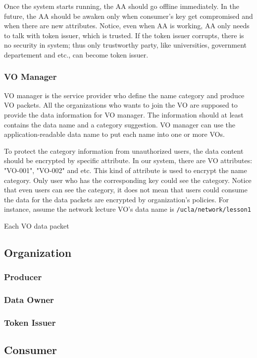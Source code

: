 Once the system starts running, the AA should go offline immediately.
In the future, the AA should be awaken only when consumer's key get compromised and when there are new attributes.
Notice, even when AA is working, AA only needs to talk with token issuer, which is trusted.
If the token issuer corrupts, there is no security in system; thus only trustworthy party, like universities, government departement and etc., can become token issuer.

\subsubsection{VO Manager}
VO manager is the service provider who define the name category and produce VO packets.
All the organizations who wants to join the VO are supposed to provide the data information for VO manager.
The information should at least contains the data name and a category suggestion.
VO manager can use the application-readable data name to put each name into one or more VOs.

To protect the category information from unauthorized users, the data content should be encrypted by specific attribute.
In our system, there are VO attributes: "VO-001", "VO-002" and etc.
This kind of attribute is used to encrypt the name category.
Only user who has the corresponding key could see the category.
Notice that even users can see the category, it does not mean that users could consume the data for the data packets are encrypted by organization's policies.
For instance, assume the network lecture VO's data name is \texttt{/ucla/network/lesson1}

Each VO data packet

\subsection{Organization}

\subsubsection{Producer}

\subsubsection{Data Owner}

\subsubsection{Token Issuer} \label{token-issuer}


\subsection{Consumer}